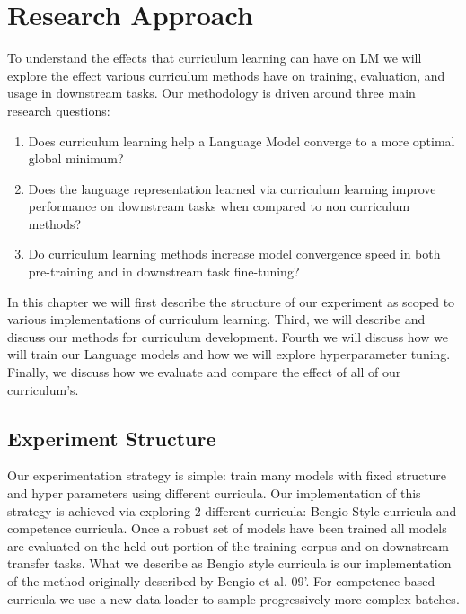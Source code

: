 \chapter{Research Approach}
To understand the effects that curriculum learning can have on LM we will explore the effect various curriculum methods have on training, evaluation, and usage in downstream tasks. 
Our methodology is driven around three main research questions:
\begin{enumerate}
\item Does curriculum learning help a Language Model converge to a more optimal global minimum? 
\item Does the language representation learned via curriculum learning improve performance on downstream tasks when compared to non curriculum methods?
\item  Do curriculum learning methods increase model convergence speed in both pre-training and in downstream task fine-tuning?
\end{enumerate}
In this chapter we will first describe the structure of our experiment as scoped to various implementations of curriculum learning. Third, we will describe and discuss our methods for curriculum development. Fourth we will discuss how we will train our Language models and how we will explore hyperparameter tuning. Finally, we  discuss how we evaluate and compare the effect of all of our curriculum's.
\section{Experiment Structure}
Our experimentation strategy is simple: train many models with fixed structure and hyper parameters using different curricula. Our implementation of this strategy is achieved via exploring 2 different curricula: Bengio Style curricula and competence curricula. Once a robust set of models have been trained all models are evaluated on the held out portion of the training corpus and on downstream transfer tasks. What we describe as Bengio style curricula is our implementation of the method originally described by Bengio et al. 09'. For competence based curricula we use a new data loader to sample progressively more complex batches. 
